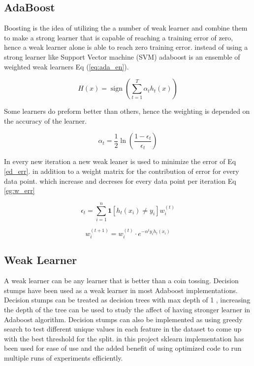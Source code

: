 \documentclass[10pt,twocolumn,letterpaper]{article}
\begin{document}
\subsection{AdaBoost}

Boosting is the idea of utilizing the a number of weak learner and combine them to make a strong learner that is capable of reaching a training error of zero, hence a weak learner alone is able to reach zero training error. instead of using a strong learner like Support Vector machine (SVM) adaboost is an ensemble of weighted weak learners Eq (\ref{eq:ada_en}).



\begin{equation}
H(x)=\operatorname{sign}\left(\sum_{t=1}^{T} \alpha_{t} h_{t}(x)\right)
\label{eq:ada_en}
\end{equation}


Some learners do preform better than others, hence the weighting is depended on the accuracy of the learner.

\begin{equation}
\alpha_{t}=\frac{1}{2} \ln \left(\frac{1-\epsilon_{t}}{\epsilon_{t}}\right)
\label{eq:alpha}
\end{equation}

In every new iteration a new weak leaner is used to minimize the error of Eq \ref{ed_err}. in addition to a weight matrix for the contribution of error for every data point. which increase and decreses for every data point per iteration Eq \ref{eg:w_err}

\begin{equation}
\epsilon_{t}=\sum_{i=1}^{n} \mathbf{1}\left[h_{t}\left(x_{i}\right) \neq y_{i}\right] w_{i}^{(t)}
\label{ed_err}
\end{equation}


\begin{equation}
w_{i}^{(t+1)}=w_{i}^{(t)} \cdot e^{-\alpha^{t} y_{i} h_{t}\left(x_{i}\right)}
\label{eg:w_err}
\end{equation}

\subsection{Weak Learner}
A weak learner can be any learner that is better than a coin tossing. Decision stumps have been used as a weak learner in most Adaboost implementations. Decision stumps can be treated as decision trees with max depth of 1 , increasing the depth of the tree can be used to study the affect of having stronger learner in Adaboost algorithm. Decision stumps can also be implemented as using greedy search to test different unique values in each feature in the dataset to come up with the best threshold for the split. in this project sklearn implementation has been used for ease of use and the added benefit of using optimized code to run multiple runs of experiments efficiently. 
\end{document}
